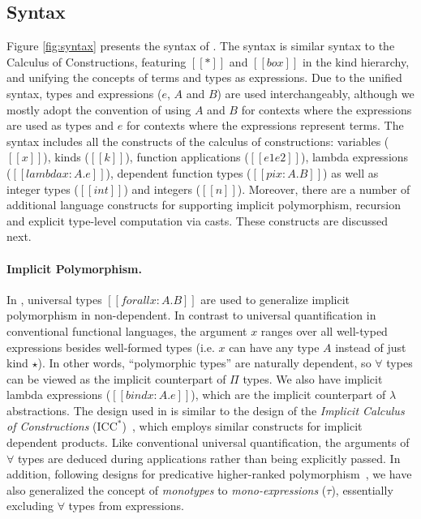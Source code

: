 \subsection{Syntax}

Figure \ref{fig:syntax} presents the syntax of \name. The syntax is similar
syntax to the Calculus of Constructions, featuring
$[[*]]$ and $[[box]]$ in the kind hierarchy, and unifying the concepts of terms
and types as expressions. Due to the unified syntax, types and
expressions ($e$, $A$ and $B$) are used
interchangeably, although we mostly adopt the convention of using $A$ and $B$
for contexts where the expressions are used as types and $e$ for contexts
where the expressions represent terms.
The syntax includes all the constructs of the calculus of constructions:
variables ($[[x]]$), kinds ($[[k]]$), function applications  ($[[e1 e2]]$),
lambda expressions ($[[lambda x : A. e]]$), dependent function types ($[[pi x : A. B]]$)
as well as integer types ($[[int]]$) and integers ($[[n]]$).
Moreover, there are a number of additional language constructs for
supporting implicit polymorphism, recursion and explicit type-level computation
via casts. These constructs are discussed next.

\paragraph{Implicit Polymorphism.}
In \name, universal types $[[forall x : A. B]]$ are used to generalize implicit
polymorphism in non-dependent.
In contrast to universal quantification in conventional functional languages, the
argument $x$ ranges over all well-typed expressions besides well-formed
types (i.e. $x$ can have any type $A$ instead of just kind $\star$).
In other words, ``polymorphic types'' are naturally dependent, so $\forall$
types can be viewed as the implicit counterpart of $\Pi$ types. We also have
implicit lambda expressions ($[[bind x : A. e]]$), which are the implicit counterpart of
  $\lambda$ abstractions. The design used in \name
  is similar to the design of the \emph{Implicit Calculus of Constructions} ($\text{ICC}^*$)~\cite{barras2008implicit}, which
  employs similar constructs for implicit dependent products.
Like conventional universal quantification, the arguments of $\forall$ types are
deduced during applications rather than being explicitly passed.
In addition, following designs for predicative higher-ranked polymorphism~\cite{oderskylufer,DK,PJ}, we have also generalized the concept of \emph{monotypes} to
\emph{mono-expressions} ($\tau$), essentially excluding $\forall$ types from expressions.

